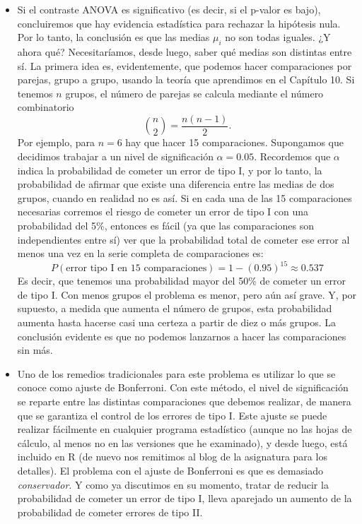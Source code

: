     \begin{itemize}
        \item Si el contraste ANOVA es significativo  (es decir, si el p-valor es bajo), concluiremos que hay evidencia estadística para rechazar la hipótesis nula. Por lo tanto, la conclusión es que las medias $\mu_i$ no son todas iguales. ¿Y ahora qué? Necesitaríamos, desde luego, saber qué medias son distintas entre sí.  La primera idea es, evidentemente, que podemos hacer comparaciones por parejas, grupo a grupo, usando la teoría que aprendimos en el Capítulo 10. Si tenemos $n$ grupos, el número de parejas se calcula mediante el número combinatorio
            \[\binom{n}{2}=\dfrac{n(n-1)}{2}.\]
            Por ejemplo, para $n=6$ hay que hacer 15 comparaciones. Supongamos que decidimos trabajar a un nivel de significación $\alpha=0.05$. Recordemos que $\alpha$ indica la probabilidad de cometer un error de tipo I, y por lo tanto, la probabilidad de afirmar que existe una diferencia entre las medias de dos grupos, cuando en realidad no es así. Si en cada una de las 15 comparaciones necesarias corremos el riesgo de cometer un error de tipo I con una probabilidad del 5\%, entonces es fácil (ya que las comparaciones son independientes entre sí) ver que la probabilidad total de cometer ese error al menos una vez en la serie completa de comparaciones es:
            \[P(\mbox{error tipo I en 15 comparaciones})=1-(0.95)^{15}\approx 0.537\]
            Es decir, que tenemos una probabilidad mayor del 50\% de cometer un error de tipo I. Con menos grupos el problema es menor, pero aún así grave. Y, por supuesto, a medida que aumenta el número de grupos, esta probabilidad aumenta hasta hacerse casi una certeza a partir de diez o más grupos. La conclusión evidente es que no podemos lanzarnos a hacer las comparaciones sin más.

        \item Uno de los remedios tradicionales para este problema es utilizar lo que se conoce como {\sf ajuste de Bonferroni}. Con este método, el nivel de significación se reparte entre las distintas comparaciones que debemos realizar, de manera que se garantiza el control de los errores de tipo I. Este ajuste se puede realizar fácilmente en cualquier programa estadístico (aunque no las hojas de cálculo, al menos no en las versiones que he examinado), y desde luego, está incluido en R (de nuevo nos remitimos al blog de la asignatura para los detalles). El problema con el ajuste de Bonferroni es que es demasiado {\em conservador}. Y como ya discutimos en su momento, tratar de reducir la probabilidad de cometer un error de tipo I, lleva aparejado un aumento de la probabilidad de cometer errores de tipo II.


\end{itemize}
